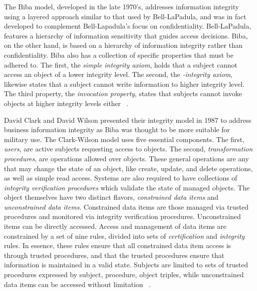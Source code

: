 The Biba model, developed in the late 1970's, addresses information integrity using a layered approach similar to that used by Bell-LaPadula, and was in fact developed to complement Bell-Lapadula's focus on confidentiality.  Bell-LaPadula, features a hierarchy of information sensitivity that guides access decisions.  Biba, on the other hand, is based on a hierarchy of information integrity rather than confidentiality.  Biba also has a collection of specific properties that must be adhered to.  The first, the {\it simple integrity axiom}, holds that a subject cannot access an object of a lower integrity level.  The second, the {\it *-integrity axiom}, likewise states that a subject cannot write information to higher integrity level.  The third property, the {\it invocation property}, states that subjects cannot invoke objects at higher integrity levels either ~\cite{Biba1977}.

David Clark and David Wilson presented their integrity model in 1987 to address business information integrity as Biba was thought to be more suitable for military use.  The Clark-Wilson model uses five essential components.  The first, {\it users}, are active subjects requesting access to objects.  The second, {\it transformation procedures}, are operations allowed over objects.  These general operations are any that may change the state of an object, like create, update, and delete operations, as well as simple read access.  Systems are also required to have collections of {\it integrity verification procedures} which validate the state of managed objects.  The object themselves have two distinct flavors, {\it constrained data items} and {\it unconstrained data items}.  Constrained data items are those managed via trusted procedures and monitored via integrity verification procedures.  Unconstrained items can be directly accessed.  Access and management of data items are constrained by a set of nine rules, divided into sets of {\it certification} and {\it integrity} rules.  In essence, these rules ensure that all constrained data item access is through trusted procedures, and that the trusted procedures ensure that information is maintained in a valid state.  Subjects are limited to sets of trusted procedures expressed by subject, procedure, object triples, while unconstrained data items can be accessed without limitation ~\cite{ClaWil87}.





